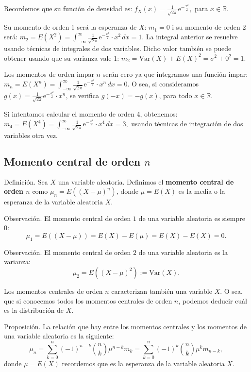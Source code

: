 \documentclass[]{book}
\begin{document}
Recordemos que su función de densidad es: \(f_X(x)=\frac{1}{\sqrt{2\pi}}\mathrm{e}^{-\frac{x^2}{2}},\) para \(x\in \mathbb{R}\).

Su momento de orden 1 será la esperanza de \(X\): \(m_1 = 0\) i su momento de orden 2 será:
\(m_2 = E\left(X^2\right)=\int_{-\infty}^\infty \frac{1}{\sqrt{2\pi}}\mathrm{e}^{-\frac{x^2}{2}}\cdot x^2\, dx = 1.\)
La integral anterior se resuelve usando técnicas de integrales de dos variables.
Dicho valor también se puede obtener usando que su varianza vale 1:
\(m_2 = \mathrm{Var}(X)+E(X)^2 = \sigma^2 +0^2 = 1.\)

Los momentos de orden impar \(n\) serán cero ya que integramos una función impar:
\(m_n = E\left(X^n\right)=\int_{-\infty}^\infty \frac{1}{\sqrt{2\pi}}\mathrm{e}^{-\frac{x^2}{2}}\cdot x^n\, dx = 0.\)
O sea, si consideramos \(g(x)=\frac{1}{\sqrt{2\pi}}\mathrm{e}^{-\frac{x^2}{2}}\cdot x^n\), se verifica \(g(-x)=-g(x)\), para todo \(x\in\mathbb{R}\).

Si intentamos calcular el momento de orden 4, obtenemos:
\(m_4 = E\left(X^4\right)=\int_{-\infty}^\infty \frac{1}{\sqrt{2\pi}}\mathrm{e}^{-\frac{x^2}{2}}\cdot x^4\, dx = 3,\) usando técnicas de integración de dos variables otra vez.

\hypertarget{momento-central-de-orden-n}{%
\subsection{\texorpdfstring{Momento central de orden \(n\)}{Momento central de orden n}}\label{momento-central-de-orden-n}}

 Definición.
Sea \(X\) una variable aleatoria. Definimos el \textbf{momento central de orden \(n\)} como
\(\mu_n = E\left((X-\mu)^n\right)\), donde \(\mu =E(X)\) es la media o la esperanza de la variable aleatoria \(X\).

 Observación.
El momento central de orden \(1\) de una variable aleatoria es siempre 0:
\[
\mu_1 = E\left((X-\mu)\right)=E(X)-E(\mu)=E(X)-E(X)=0.
\]

 Observación.
El momento central de orden \(2\) de una variable aleatoria es la varianza:
\[
\mu_2 = E\left((X-\mu)^2\right):= \mathrm{Var}(X).
\]

Los momentos centrales de orden \(n\) caracterizan también una variable \(X\). O sea, que si conocemos todos los momentos centrales de orden \(n\), podemos deducir cuál es la distribución de \(X\).

 Proposición.
La relación que hay entre los momentos centrales y los momentos de una variable aleatoria es la siguiente:
\[
\mu_n = \sum_{k=0}^n (-1)^{n-k} \binom{n}{k} \mu^{n-k} m_k = \sum_{k=0}^n (-1)^{k} \binom{n}{k} \mu^{k} m_{n-k},
\]
donde \(\mu =E(X)\) recordemos que es la esperanza de la variable aleatoria \(X\).
\end{document}
